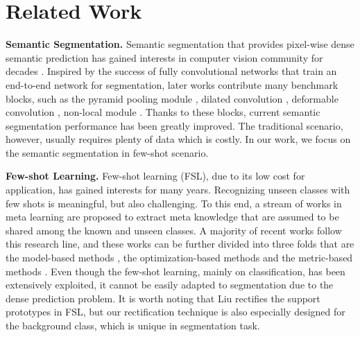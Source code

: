 \documentclass[10pt,twocolumn,letterpaper]{article}
\begin{document}
 \section{Related Work}

\textbf{Semantic Segmentation.} 
Semantic segmentation that provides pixel-wise dense semantic prediction has gained interests in computer vision community for decades \cite{shi2000normalized, comaniciu2002mean, ren2012rgb}. Inspired by the success of fully convolutional networks \cite{long2015fully} that train an end-to-end network for segmentation, later works \cite{zhao2017pyramid, chen2018encoder, zhang2018context, huang2019ccnet, yuan2019object,chen2018encoder, ronneberger2015u, lin2017refinenet, sun2019high} contribute many benchmark blocks, such as the pyramid pooling module \cite{zhao2017pyramid}, dilated convolution \cite{chen2018encoder}, deformable convolution \cite{dai2017deformable}, non-local module \cite{wang2018non, zhu2019asymmetric} \etc. Thanks to these blocks, current semantic segmentation performance has been greatly improved.
The traditional scenario, however, usually requires plenty of data which is costly. In our work, we focus on the semantic segmentation in few-shot scenario. 

\textbf{Few-shot Learning.} 
Few-shot learning (FSL), due to its low cost for application, has gained interests for many years. Recognizing unseen classes with few shots is meaningful, but also challenging. To this end, a stream of works in meta learning \cite{finn2017model,snell2017prototypical, ren2018meta} are proposed to extract meta knowledge that are assumed to be shared among the known and unseen classes. A majority of recent works follow this research line, and these works can be further divided into three folds that are the model-based methods \cite{santoro2016one, munkhdalai2017meta}, the optimization-based methods \cite{finn2017model, nichol2018first, ravi2016optimization} and the metric-based methods \cite{vinyals2016matching, snell2017prototypical, sung2018learning}. Even though the few-shot learning, mainly on classification, has been extensively exploited, it cannot be easily adapted to segmentation due to the dense prediction problem. It is worth noting that Liu \etal \cite{liu2019prototype} rectifies the support prototypes in FSL, but our rectification technique is also especially designed for the background class, which is unique in segmentation task.
\end{document}
